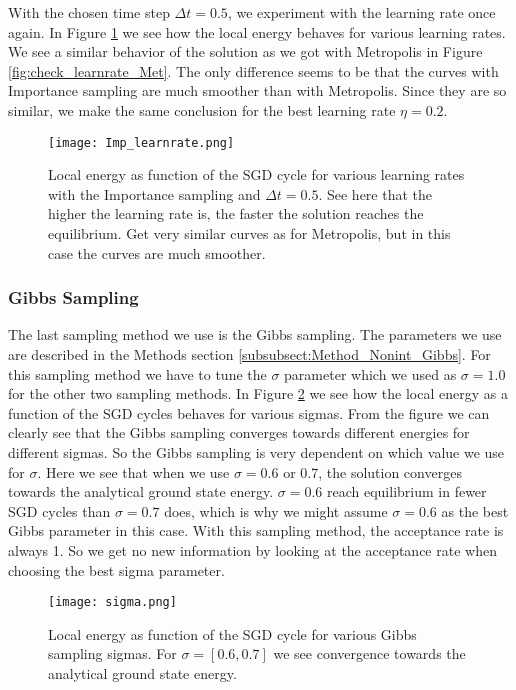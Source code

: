 \documentclass[12pt,a4paper,english]{article}
\begin{document}
With the chosen time step $\Delta t=0.5$, we experiment with the learning rate once again. In Figure \ref{fig:check_learnrate_Imp} we see how the local energy behaves for various learning rates. We see a similar behavior of the solution as we got with Metropolis in Figure \ref{fig:check_learnrate_Met}. The only difference seems to be that the curves with Importance sampling are much smoother than with Metropolis. Since they are so similar, we make the same conclusion for the best learning rate $\eta=0.2$.

\begin{figure}[htbp!]
	\centering\texttt{[image: Imp\_learnrate.png]}
	\caption{Local energy as function of the SGD cycle for various learning rates with the Importance sampling and $\Delta t=0.5$. See here that the higher the learning rate is, the faster the solution reaches the equilibrium. Get very similar curves as for Metropolis, but in this case the curves are much smoother. \label{fig:check_learnrate_Imp}}
\end{figure} 

\subsubsection{Gibbs Sampling}
\label{subsubsect:Results_nonint_Gibbs}
The last sampling method we use is the Gibbs sampling. The parameters we use are described in the Methods section \ref{subsubsect:Method_Nonint_Gibbs}. For this sampling method we have to tune the $\sigma$ parameter which we used as $\sigma=1.0$ for the other two sampling methods. In Figure \ref{fig:check_sigma} we see how the local energy as a function of the SGD cycles behaves for various sigmas. From the figure we can clearly see that the Gibbs sampling converges towards different energies for different sigmas. So the Gibbs sampling is very dependent on which value we use for $\sigma$. Here we see that when we use $\sigma=0.6$ or 0.7, the solution converges towards the analytical ground state energy. $\sigma=0.6$ reach equilibrium in fewer SGD cycles than $\sigma=0.7$ does, which is why we might assume $\sigma=0.6$ as the best Gibbs parameter in this case. With this sampling method, the acceptance rate is always 1. So we get no new information by looking at the acceptance rate when choosing the best sigma parameter.

\begin{figure}[htbp!]
	\centering\texttt{[image: sigma.png]}
	\caption{Local energy as function of the SGD cycle for various Gibbs sampling sigmas. For $\sigma=[0.6, 0.7]$ we see convergence towards the analytical ground state energy. \label{fig:check_sigma}}
\end{figure}
\end{document}
